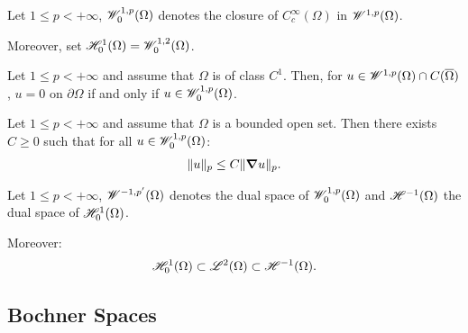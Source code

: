 \begin{definition}
    Let $1 \leq p < +\infty$, $\mathscr{W}^{1, p}_0(\Omega)$ denotes the closure of $C_c^{\infty}(\Omega)$ in $\mathscr{W}^{1, p}(\Omega)$.

    Moreover, set $\mathscr{H}^{1}_0(\Omega) = \mathscr{W}^{1, 2}_0(\Omega)$.
\end{definition}

\begin{theorem}
    Let $1 \leq p < +\infty$ and assume that $\Omega$ is of class $C^1$. Then, for $u \in \mathscr{W}^{1, p}(\Omega) \cap C(\overline{\Omega})$, $u = 0$ on $\partial \Omega$ if and only if $u \in \mathscr{W}^{1, p}_0(\Omega)$.
\end{theorem}

\begin{theorem}
    Let $1 \leq p < +\infty$ and assume that $\Omega$ is a bounded open set. Then there exists $C \geq 0$ such that for all $u \in \mathscr{W}^{1, p}_0(\Omega)$:
    \begin{gather}
        \lVert u \rVert_p \leq C \lVert \bm{\nabla} u \rVert_p.
    \end{gather}
\end{theorem}

\begin{definition}
    Let $1 \leq p < +\infty$, $\mathscr{W}^{-1, p^{\prime}}(\Omega)$ denotes the dual space of $\mathscr{W}^{1, p}_0(\Omega)$ and $\mathscr{H}^{-1}(\Omega)$ the dual space of $\mathscr{H}^{1}_0(\Omega)$.

    Moreover:
    \begin{gather}
        \mathscr{H}^{1}_0(\Omega) \subset \mathscr{L}^{2}(\Omega) \subset \mathscr{H}^{-1}(\Omega).
    \end{gather}
\end{definition}

\newpage
\subsection{Bochner Spaces}

